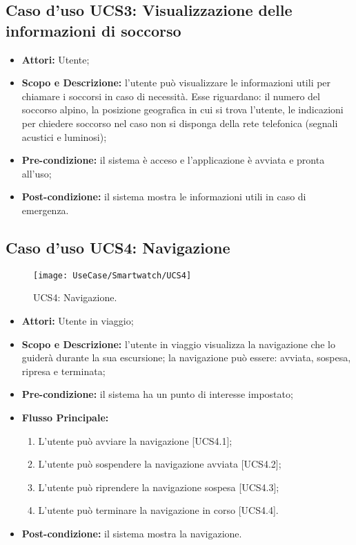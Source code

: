 \subsection{Caso d'uso UCS3: Visualizzazione delle informazioni di soccorso}
\begin{itemize}
\item \textbf{Attori:} Utente;
\item \textbf{Scopo e Descrizione:} l'utente può visualizzare le informazioni utili per chiamare i soccorsi in caso di necessità. Esse riguardano: il numero del soccorso alpino, la posizione geografica in cui si trova l'utente, le indicazioni per chiedere soccorso nel caso non si disponga della rete telefonica (segnali acustici e luminosi);
\item \textbf{Pre-condizione:} il sistema è acceso e l'applicazione è avviata e pronta all'uso;
\item \textbf{Post-condizione:} il sistema mostra le informazioni utili in caso di emergenza.
\end{itemize}

\subsection{Caso d'uso UCS4: Navigazione}

\begin{figure}[H]
\centering
\texttt{[image: UseCase/Smartwatch/UCS4]}
\caption{UCS4: Navigazione.}
\end{figure}

\begin{itemize}
\item \textbf{Attori:} Utente in viaggio;
\item \textbf{Scopo e Descrizione:} l'utente in viaggio visualizza la navigazione che lo guiderà durante la sua escursione; la navigazione può essere: avviata, sospesa, ripresa e terminata;
\item \textbf{Pre-condizione:} il sistema ha un punto di interesse impostato;
\item \textbf{Flusso Principale:} 
\begin{enumerate}
\item L'utente può avviare la navigazione [UCS4.1];
\item L'utente può sospendere la navigazione avviata [UCS4.2];
\item L'utente può riprendere la navigazione sospesa [UCS4.3];
\item L'utente può terminare la navigazione in corso [UCS4.4].
\end{enumerate}
\item \textbf{Post-condizione:} il sistema mostra la navigazione.
\end{itemize}

